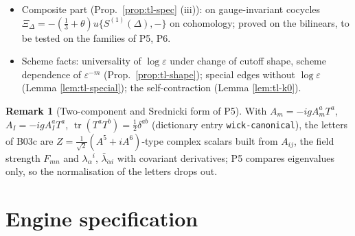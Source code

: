 \documentclass[11pt]{article}
\numberwithin{equation}{section}
\theoremstyle{plain}
\theoremstyle{definition}
\newtheorem{remark}[theorem]{Remark}
\begin{document}
\begin{itemize}
\item[P7] Composite part (Prop.~\ref{prop:tl-spec} (iii)): on gauge-invariant cocycles $\Xi_\Delta=-(\tfrac13+\theta)u\{S^{(1)}(\Delta),-\}$ on cohomology; proved on the bilinears, to be tested on the families of P5, P6.
\item[P8] Scheme facts: universality of $\log\varepsilon$ under change of cutoff shape, scheme dependence of $\varepsilon^{-m}$ (Prop.~\ref{prop:tl-shape}); special edges without $\log\varepsilon$ (Lemma \ref{lem:tl-special}); the self-contraction (Lemma \ref{lem:tl-k0}).
\end{itemize}

\begin{remark}[Two-component and Srednicki form of P5]
With $A_m=-igA^a_mT^a$, $A_I=-igA^a_IT^a$, $\operatorname{tr}(T^aT^b)=\frac12\delta^{ab}$ (dictionary entry \texttt{wick-canonical}), the letters of B03c are $Z=\tfrac1{\sqrt2}(A^5+iA^6)$-type complex scalars built from $A_{ij}$, the field strength $F_{mn}$ and $\lambda_\alpha{}^i$, $\bar\lambda_{\dot\alpha i}$ with covariant derivatives; P5 compares eigenvalues only, so the normalisation of the letters drops out.
\end{remark}

\section{Engine specification}
\label{sec:tl-engine}
\end{document}
